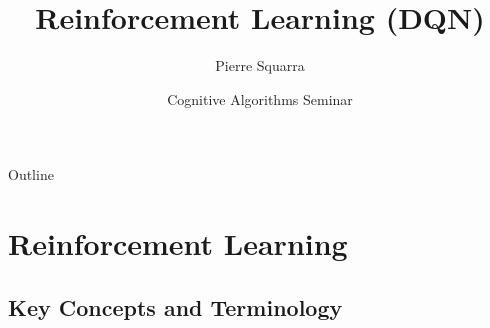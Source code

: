 \documentclass[xcolor=dvipsnames]{beamer}
\title{Reinforcement Learning (DQN)}
\author{Pierre Squarra}
\date{Cognitive Algorithms Seminar}
\begin{document}
{
\begin{frame}
  \titlepage
\end{frame}
}

\begin{frame}{Outline}
\tableofcontents
\end{frame}

\section{Reinforcement Learning}

\subsection{Key Concepts and Terminology}
\end{document}
